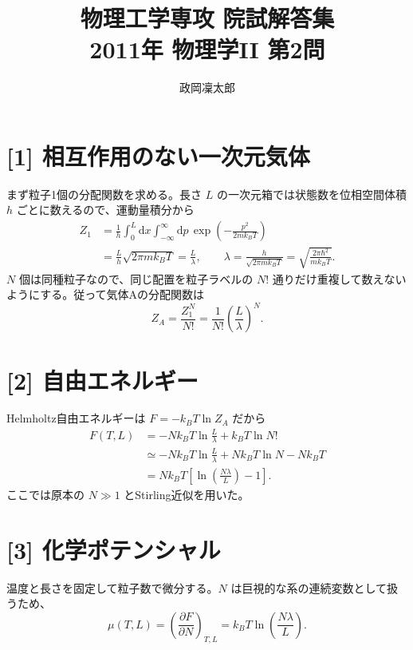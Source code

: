 \documentclass[11pt,a4paper]{article}
\title{物理工学専攻 院試解答集\\2011年 物理学II 第2問}
\author{政岡凜太郎}
\date{}
\begin{document}
\maketitle

\section*{[1] 相互作用のない一次元気体}
まず粒子1個の分配関数を求める。長さ $L$ の一次元箱では状態数を位相空間体積 $h$ ごとに数えるので、運動量積分から
\begin{align}
  Z_1
  &=\frac{1}{h}\int_0^L\mathrm{d}x
      \int_{-\infty}^{\infty}\mathrm{d}p\,
      \exp\!\left(-\frac{p^2}{2mk_BT}\right)\\
  &=\frac{L}{h}\sqrt{2\pi m k_BT}
   =\frac{L}{\lambda},
  \qquad
  \lambda=\frac{h}{\sqrt{2\pi m k_BT}}
  =\sqrt{\frac{2\pi\hbar^2}{mk_BT}}.
\end{align}
$N$ 個は同種粒子なので、同じ配置を粒子ラベルの $N!$ 通りだけ重複して数えないようにする。従って気体Aの分配関数は
\begin{equation}
  \boxed{Z_A=\frac{Z_1^N}{N!}
    =\frac{1}{N!}\left(\frac{L}{\lambda}\right)^N.}
\end{equation}

\section*{[2] 自由エネルギー}
Helmholtz自由エネルギーは $F=-k_BT\ln Z_A$ だから
\begin{align}
  F(T,L)
  &=-Nk_BT\ln\frac{L}{\lambda}+k_BT\ln N!\\
  &\simeq -Nk_BT\ln\frac{L}{\lambda}
      +Nk_BT\ln N-Nk_BT\\
  &=\boxed{Nk_BT\left[\ln\!\left(\frac{N\lambda}{L}\right)-1\right].}
\end{align}
ここでは原本の $N\gg1$ とStirling近似を用いた。

\section*{[3] 化学ポテンシャル}
温度と長さを固定して粒子数で微分する。$N$ は巨視的な系の連続変数として扱うため、
\begin{equation}
  \boxed{\mu(T,L)=\left(\frac{\partial F}{\partial N}\right)_{T,L}
  =k_BT\ln\!\left(\frac{N\lambda}{L}\right).}
\end{equation}
\end{document}

